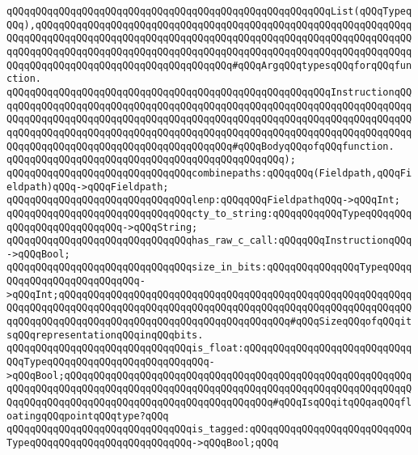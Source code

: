 \verb|qQQqqQQqqQQqqQQqqQQqqQQqqQQqqQQqqQQqqQQqqQQqqQQqqQQqqQQqList(qQQqTypeqQQq),qQQqqQQqqQQqqQQqqQQqqQQqqQQqqQQqqQQqqQQqqQQqqQQqqQQqqQQqqQQqqQQqqQQqqQQqqQQqqQQqqQQqqQQqqQQqqQQqqQQqqQQqqQQqqQQqqQQqqQQqqQQqqQQqqQQqqQQqqQQqqQQqqQQqqQQqqQQqqQQqqQQqqQQqqQQqqQQqqQQqqQQqqQQqqQQqqQQqqQQqqQQqqQQqqQQqqQQqqQQqqQQqqQQqqQQqqQQqqQQqqQQq#qQQqArgqQQqtypesqQQqforqQQqfunction.|\newline
\verb|qQQqqQQqqQQqqQQqqQQqqQQqqQQqqQQqqQQqqQQqqQQqqQQqqQQqqQQqInstructionqQQqqQQqqQQqqQQqqQQqqQQqqQQqqQQqqQQqqQQqqQQqqQQqqQQqqQQqqQQqqQQqqQQqqQQqqQQqqQQqqQQqqQQqqQQqqQQqqQQqqQQqqQQqqQQqqQQqqQQqqQQqqQQqqQQqqQQqqQQqqQQqqQQqqQQqqQQqqQQqqQQqqQQqqQQqqQQqqQQqqQQqqQQqqQQqqQQqqQQqqQQqqQQqqQQqqQQqqQQqqQQqqQQqqQQqqQQqqQQqqQQqqQQqqQQq#qQQqBodyqQQqofqQQqfunction.|\newline
\verb|qQQqqQQqqQQqqQQqqQQqqQQqqQQqqQQqqQQqqQQqqQQqqQQq);|\newline
\newline
\verb|qQQqqQQqqQQqqQQqqQQqqQQqqQQqqQQqcombinepaths:qQQqqQQq(Fieldpath,qQQqFieldpath)qQQq->qQQqFieldpath;|\newline
\newline
\verb|qQQqqQQqqQQqqQQqqQQqqQQqqQQqqQQqlenp:qQQqqQQqFieldpathqQQq->qQQqInt;|\newline
\newline
\verb|qQQqqQQqqQQqqQQqqQQqqQQqqQQqqQQqcty_to_string:qQQqqQQqqQQqTypeqQQqqQQqqQQqqQQqqQQqqQQqqQQq->qQQqString;|\newline
\verb|qQQqqQQqqQQqqQQqqQQqqQQqqQQqqQQqhas_raw_c_call:qQQqqQQqInstructionqQQq->qQQqBool;|\newline
\verb|qQQqqQQqqQQqqQQqqQQqqQQqqQQqqQQqsize_in_bits:qQQqqQQqqQQqqQQqTypeqQQqqQQqqQQqqQQqqQQqqQQqqQQq->qQQqInt;qQQqqQQqqQQqqQQqqQQqqQQqqQQqqQQqqQQqqQQqqQQqqQQqqQQqqQQqqQQqqQQqqQQqqQQqqQQqqQQqqQQqqQQqqQQqqQQqqQQqqQQqqQQqqQQqqQQqqQQqqQQqqQQqqQQqqQQqqQQqqQQqqQQqqQQqqQQqqQQqqQQqqQQqqQQqqQQqqQQq#qQQqSizeqQQqofqQQqitsqQQqrepresentationqQQqinqQQqbits.|\newline
\verb|qQQqqQQqqQQqqQQqqQQqqQQqqQQqqQQqis_float:qQQqqQQqqQQqqQQqqQQqqQQqqQQqqQQqTypeqQQqqQQqqQQqqQQqqQQqqQQqqQQq->qQQqBool;qQQqqQQqqQQqqQQqqQQqqQQqqQQqqQQqqQQqqQQqqQQqqQQqqQQqqQQqqQQqqQQqqQQqqQQqqQQqqQQqqQQqqQQqqQQqqQQqqQQqqQQqqQQqqQQqqQQqqQQqqQQqqQQqqQQqqQQqqQQqqQQqqQQqqQQqqQQqqQQqqQQqqQQqqQQqqQQq#qQQqIsqQQqitqQQqaqQQqfloatingqQQqpointqQQqtype?qQQq|\newline
\verb|qQQqqQQqqQQqqQQqqQQqqQQqqQQqqQQqis_tagged:qQQqqQQqqQQqqQQqqQQqqQQqqQQqTypeqQQqqQQqqQQqqQQqqQQqqQQqqQQq->qQQqBool;qQQq|\newline
